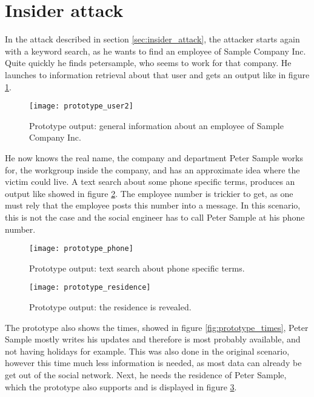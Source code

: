 \section{Insider attack}

In the attack described in section \ref{sec:insider_attack},
the attacker starts again with a keyword search, as he wants to find an
employee of Sample Company Inc. Quite quickly he finds petersample, who seems to work
for that company. He launches to information retrieval about that user and gets
an output like in figure \ref{fig:prototype_user2}.

\begin{figure}[htb]
  \begin{center}
    \texttt{[image: prototype\_user2]}
    \caption{Prototype output: general information about an employee of Sample
    Company Inc.}
    \label{fig:prototype_user2}
  \end{center}
\end{figure}

He now knows the real name, the
company and department Peter Sample works for, the workgroup inside the
company, and has an approximate idea where the victim could live. A text search
about some phone specific terms, produces an output like showed in figure
\ref{fig:prototype_phone}. The employee number is trickier to get, as one must
rely that the employee posts this number into a message. In this scenario, this
is not the case and the social engineer has to call Peter Sample at his phone
number.

\begin{figure}[htb]
  \begin{center}
    \texttt{[image: prototype\_phone]}
    \caption{Prototype output: text search about phone specific terms.}
    \label{fig:prototype_phone}
  \end{center}
\end{figure}


\begin{figure}[htb]
  \begin{center}
    \texttt{[image: prototype\_residence]}
    \caption{Prototype output: the residence is revealed.}
    \label{fig:prototype_residence}
  \end{center}
\end{figure}
The prototype also shows the times, showed in figure
\ref{fig:prototype_times}, Peter Sample mostly writes his
updates and therefore is most probably available, and not having holidays for
example. This was also done in the original scenario, however this time much
less information is needed, as most data can already be get out of the social
network. Next, he needs the residence of Peter Sample, which the prototype also
supports and is displayed in figure \ref{fig:prototype_residence}.

